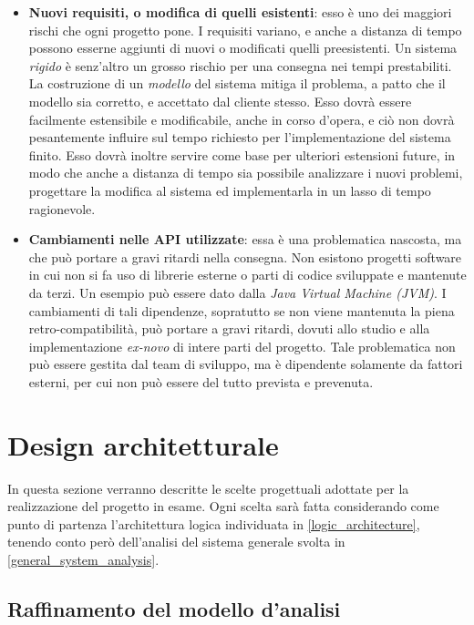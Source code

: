 \documentclass[a4paper,12pt]{report}
\begin{document}
\begin{itemize}
	\item \textbf{Nuovi requisiti, o modifica di quelli esistenti}: esso è uno dei maggiori rischi che ogni progetto pone. I requisiti variano, e anche a distanza di tempo possono esserne aggiunti di nuovi o modificati quelli preesistenti. Un sistema \emph{rigido} è senz'altro un grosso rischio per una consegna nei tempi prestabiliti. La costruzione di un \emph{modello} del sistema mitiga il problema, a patto che il modello sia corretto, e accettato dal cliente stesso. Esso dovrà essere facilmente estensibile e modificabile, anche in corso d'opera, e ciò non dovrà pesantemente influire sul tempo richiesto per l'implementazione del sistema finito. Esso dovrà inoltre servire come base per ulteriori estensioni future, in modo che anche a distanza di tempo sia possibile analizzare i nuovi problemi, progettare la modifica al sistema ed implementarla in un lasso di tempo ragionevole. 
	\item \textbf{Cambiamenti nelle API utilizzate}: essa è una problematica nascosta, ma che può portare a gravi ritardi nella consegna. Non esistono progetti software in cui non si fa uso di librerie esterne o parti di codice sviluppate e mantenute da terzi. Un esempio può essere dato dalla \emph{Java Virtual Machine (JVM)}. I cambiamenti di tali dipendenze, sopratutto se non viene mantenuta la piena retro-compatibilità, può portare a gravi ritardi, dovuti allo studio e alla implementazione \emph{ex-novo} di intere parti del progetto. Tale problematica non può essere gestita dal team di sviluppo, ma è dipendente solamente da fattori esterni, per cui non può essere del tutto prevista e prevenuta.
\end{itemize}

\chapter{Design architetturale}

In questa sezione verranno descritte le scelte progettuali adottate per la realizzazione del progetto in esame. Ogni scelta sarà fatta considerando come punto di partenza l'architettura logica individuata in \autoref{logic_architecture}, tenendo conto però dell'analisi del sistema generale svolta in \autoref{general_system_analysis}.

\section{Raffinamento del modello d'analisi}
\end{document}
